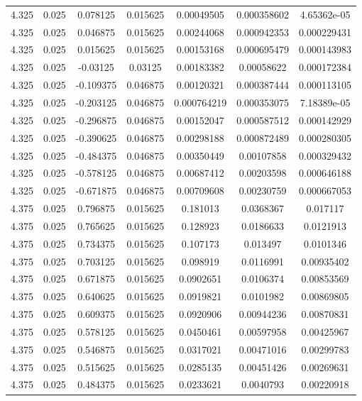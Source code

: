 \begin{flushleft}
\begin{longtable}{ccccccc}
4.325 & 0.025 & 0.078125 & 0.015625 & 0.00049505 & 0.000358602 & 4.65362e-05  \\ 
4.325 & 0.025 & 0.046875 & 0.015625 & 0.00244068 & 0.000942353 & 0.000229431  \\ 
4.325 & 0.025 & 0.015625 & 0.015625 & 0.00153168 & 0.000695479 & 0.000143983  \\ 
4.325 & 0.025 & -0.03125 & 0.03125 & 0.00183382 & 0.00058622 & 0.000172384  \\ 
4.325 & 0.025 & -0.109375 & 0.046875 & 0.00120321 & 0.000387444 & 0.000113105  \\ 
4.325 & 0.025 & -0.203125 & 0.046875 & 0.000764219 & 0.000353075 & 7.18389e-05  \\ 
4.325 & 0.025 & -0.296875 & 0.046875 & 0.00152047 & 0.000587512 & 0.000142929  \\ 
4.325 & 0.025 & -0.390625 & 0.046875 & 0.00298188 & 0.000872489 & 0.000280305  \\ 
4.325 & 0.025 & -0.484375 & 0.046875 & 0.00350449 & 0.00107858 & 0.000329432  \\ 
4.325 & 0.025 & -0.578125 & 0.046875 & 0.00687412 & 0.00203598 & 0.000646188  \\ 
4.325 & 0.025 & -0.671875 & 0.046875 & 0.00709608 & 0.00230759 & 0.000667053  \\ 
4.375 & 0.025 & 0.796875 & 0.015625 & 0.181013 & 0.0368367 & 0.017117  \\ 
4.375 & 0.025 & 0.765625 & 0.015625 & 0.128923 & 0.0186633 & 0.0121913  \\ 
4.375 & 0.025 & 0.734375 & 0.015625 & 0.107173 & 0.013497 & 0.0101346  \\ 
4.375 & 0.025 & 0.703125 & 0.015625 & 0.098919 & 0.0116991 & 0.00935402  \\ 
4.375 & 0.025 & 0.671875 & 0.015625 & 0.0902651 & 0.0106374 & 0.00853569  \\ 
4.375 & 0.025 & 0.640625 & 0.015625 & 0.0919821 & 0.0101982 & 0.00869805  \\ 
4.375 & 0.025 & 0.609375 & 0.015625 & 0.0920906 & 0.00944236 & 0.00870831  \\ 
4.375 & 0.025 & 0.578125 & 0.015625 & 0.0450461 & 0.00597958 & 0.00425967  \\ 
4.375 & 0.025 & 0.546875 & 0.015625 & 0.0317021 & 0.00471016 & 0.00299783  \\ 
4.375 & 0.025 & 0.515625 & 0.015625 & 0.0285135 & 0.00451426 & 0.00269631  \\ 
4.375 & 0.025 & 0.484375 & 0.015625 & 0.0233621 & 0.0040793 & 0.00220918  \\ 

\end{longtable}
\end{flushleft}

